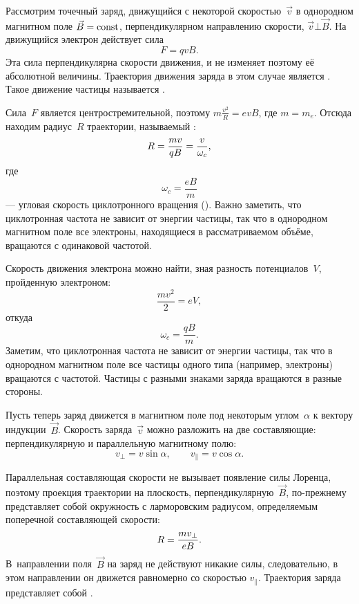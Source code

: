 Рассмотрим точечный заряд, движущийся с некоторой скоростью~$\vec{v}$
в однородном магнитном поле $\vec{B}=\mathrm{const}$, перпендикулярном направлению скорости,
$\vec{v}\bot \vec{B}$. На движущийся электрон действует сила
\begin{equation*}
	F=qvB.
\end{equation*}
Эта сила перпендикулярна скорости движения, и не изменяет поэтому
её абсолютной величины. Траектория движения заряда в этом случае является
. Такое движение частицы называется .

Сила~$F$ является центростремительной, поэтому $m\frac{v^2}{R}=evB$, где $m=m_e$.
Отсюда находим радиус~$R$ траектории, называемый :
\begin{equation}
	\eqmark{3.2}
    R =\frac{m v}{qB}= \frac{v}{\omega_c},
\end{equation}
где
\begin{equation*}
	\omega_c=\frac{eB}{m}
\end{equation*}
--- угловая скорость циклотронного вращения ().
Важно заметить, что циклотронная частота не
зависит от энергии частицы, так что в однородном магнитном поле все электроны,
находящиеся в рассматриваемом объёме, вращаются с одинаковой частотой.

Скорость движения электрона можно найти, зная разность потенциалов~$V$,
пройденную электроном:
\begin{equation*}
	\frac{mv^2}{2}=eV,
\end{equation*}
откуда
\begin{equation}
	\omega_c=\frac{qB}{m}.
\end{equation}
Заметим, что циклотронная частота не зависит от энергии частицы,
так что в однородном магнитном поле все частицы одного типа (например,
электроны) вращаются с  частотой.
Частицы с разными знаками заряда вращаются в разные стороны.

Пусть теперь заряд движется в магнитном поле под некоторым углом~$\alpha$ к
вектору индукции~$\vec{B}$. Скорость заряда~$\vec{v}$ можно разложить
на две составляющие: перпендикулярную и параллельную магнитному полю:
\begin{equation*}
	v_{\bot}=v\sin\alpha,\qquad v_{\parallel}=v\cos\alpha.
\end{equation*}

Параллельная составляющая скорости не вызывает появление силы Лоренца, поэтому
проекция траектории на плоскость, перпендикулярную~$\vec{B}$,
по-прежнему представляет собой окружность с ларморовским радиусом,
определяемым поперечной составляющей скорости:
\begin{equation}
	\eqmark{3.4}
	R =\frac{m v_{\bot}}{eB}.
\end{equation}
В~направлении поля~$\vec{B}$ на заряд не действуют никакие силы,
следовательно, в этом направлении он движется равномерно со скоростью
$v_{\parallel}$.
Траектория заряда представляет собой .

